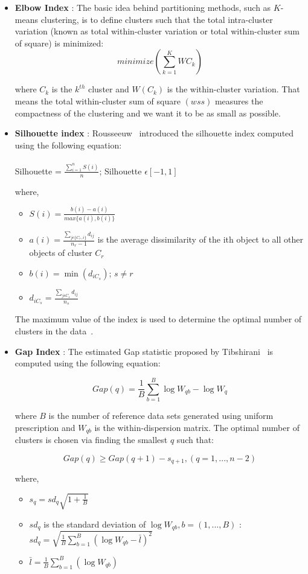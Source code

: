 \begin{itemize}
\item \textbf{Elbow Index} : The basic idea behind partitioning methods, such as $K$-means clustering,
is to define clusters such that the total intra-cluster variation (known as total within-cluster
variation or total within-cluster sum of square) is minimized:
$$minimize(\sum_{k=1}^{K}WC_k)$$

where $C_k$ is the $k^{th}$ cluster and $W(C_k)$ is the within-cluster variation.
That means the total within-cluster sum of square $(wss)$ measures the compactness of the clustering and we want
it to be as small as possible.

\item \textbf{Silhouette index} : Rousseeuw~\cite{rousseeuw87} introduced the silhouette index computed using
the following equation:\\\\
Silhouette = $\frac{\sum_{i=1}^{n}S(i)}{n}$; Silhouette $\epsilon{[-1, 1]}$

where,
\begin{itemize}
\item $S(i) = \frac{b(i) - a(i)}{max\{a(i), b(i)\}}$
\item $a(i) = \frac{\sum_{j\epsilon\{C_r, i\}}d_{ij}}{n_r - 1}$ is the average dissimilarity of the ith object
to all other objects of cluster $C_r$
\item $b(i) = \min(d_{iC_{s}})$; $s \neq r$
\item $d_{iC_{s}} = \frac{\sum_{j \epsilon C_{s}}d_{ij}}{n_{s}}$
\end{itemize}

The maximum value of the index is used to determine the optimal number of clusters in the
data~\cite{rousseeuw90}.

\item \textbf{Gap Index} : The estimated Gap statistic proposed by Tibshirani~\cite{tibshirani01} is
computed using the following equation:

$$Gap(q) = \frac{1}{B}\sum_{b=1}^{B} \log{W_{qb}} - \log{W_{q}}$$

where $B$ is the number of reference data sets generated using uniform prescription and $W_{qb}$
is the within-dispersion matrix. The optimal number of clusters is chosen via finding the smallest
$q$ such that:

$$Gap(q) \geq Gap(q+1) - s_{q+1}, (q = 1, ..., n-2)$$

where,

\begin{itemize}
\item $s_{q} = sd_{q} \sqrt{1+\frac{1}{B}}$
\item $sd_{q}$ is the standard deviation of $\log{W_{qb}}, b = (1,...,B)$ : $sd_{q} = \sqrt{\frac{1}{B}\sum_{b=1}^{B}(\log{W_{qb}}-\bar{l})^2}$
\item $\bar{l} = \frac{1}{B}\sum_{b=1}^{B}(\log{W_{qb}}) $
\end{itemize}

\end{itemize}

